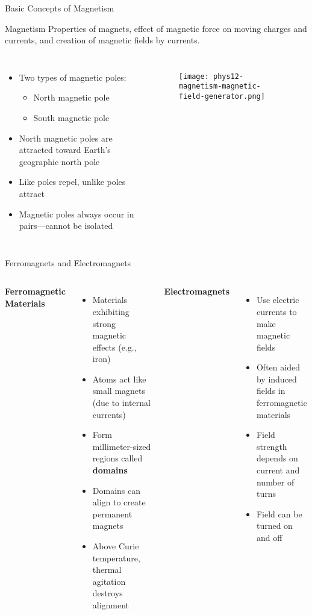 \documentclass{beamer}
\begin{document}
\begin{frame}{Basic Concepts of Magnetism}
\begin{block}{Magnetism}
Properties of magnets, effect of magnetic force on moving charges and currents, and creation of magnetic fields by currents.
\end{block}

\begin{columns}
\begin{itemize}
\item Two types of magnetic poles:
  \begin{itemize}
  \item North magnetic pole
  \item South magnetic pole
  \end{itemize}
\item North magnetic poles are attracted toward Earth's geographic north pole
\item Like poles repel, unlike poles attract
\item Magnetic poles always occur in pairs—cannot be isolated
\end{itemize}

\begin{figure}
    \centering
    \texttt{[image: phys12-magnetism-magnetic-field-generator.png]}
\end{figure}
\end{columns}
\end{frame}

\begin{frame}{Ferromagnets and Electromagnets}
\begin{columns}
\textbf{Ferromagnetic Materials}
\begin{itemize}
\item Materials exhibiting strong magnetic effects (e.g., iron)
\item Atoms act like small magnets (due to internal currents)
\item Form millimeter-sized regions called \textbf{domains}
\item Domains can align to create permanent magnets
\item Above Curie temperature, thermal agitation destroys alignment
\end{itemize}

\textbf{Electromagnets}
\begin{itemize}
\item Use electric currents to make magnetic fields
\item Often aided by induced fields in ferromagnetic materials
\item Field strength depends on current and number of turns
\item Field can be turned on and off
\end{itemize}
\end{columns}

\end{frame}
\end{document}
